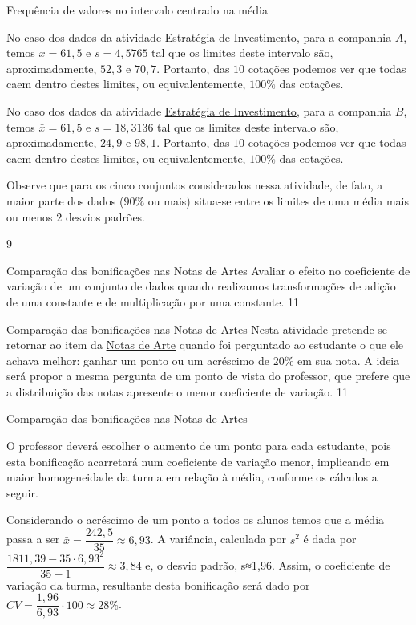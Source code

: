 {{{\begin{answer}{Frequência de valores no intervalo centrado na média}
{No caso dos dados da atividade \hyperref[\detokenize{PE104-3:ativ-estrategia-de-investimento}]{Estratégia de Investimento}, para a companhia $A$, temos $\bar{x}=61{,}5$ e $s=4{,}5765$ tal que os limites deste intervalo são, aproximadamente, $52{,}3$ e $70{,}7$. Portanto, das $10$ cotações podemos ver que todas caem dentro destes limites, ou equivalentemente, $100\%$ das cotações.

No caso dos dados da atividade \hyperref[\detokenize{PE104-3:ativ-estrategia-de-investimento}]{Estratégia de Investimento}, para a companhia $B$, temos $\bar{x}=61{,}5$ e $s=18{,}3136$ tal que os limites deste intervalo são, aproximadamente, $24{,}9$ e $98{,}1$. Portanto, das $10$ cotações podemos ver que todas caem dentro destes limites, ou equivalentemente, $100\%$ das cotações.

Observe que para os cinco conjuntos considerados nessa atividade, de fato, a maior parte dos dados ($90\%$ ou mais) situa-se entre os limites de uma média mais ou menos $2$ desvios padrões.
\columnbreak

\phantom{a}
}{9}
\end{answer}

\begin{objectives}{Comparação das bonificações nas Notas de Artes}
{
Avaliar o efeito no coeficiente de variação de um conjunto de dados quando realizamos transformações de adição de uma constante e de multiplicação por uma constante.
}{1}{1}
\end{objectives}
\marginpar{\vspace{-2em}}
\begin{sugestions}{Comparação das bonificações nas Notas de Artes}
{
Nesta atividade pretende-se retornar ao item  da \hyperref[\detokenize{PE104-0:ativ-notas-de-artes}]{Notas de Arte} quando foi perguntado ao estudante o que ele achava melhor: ganhar um ponto ou um acréscimo de $20\%$ em sua nota. A ideia será propor a mesma pergunta de um ponto de vista do professor, que prefere que a distribuição das notas apresente o menor coeficiente de variação.
}{1}{1}
\end{sugestions}
\begin{answer}{Comparação das bonificações nas Notas de Artes}
{
O professor deverá escolher o aumento de um ponto para cada estudante, pois esta bonificação acarretará num coeficiente de variação menor, implicando em maior homogeneidade da turma em relação à média, conforme os cálculos a seguir.

Considerando o acréscimo de um ponto a todos os alunos temos que a média passa a ser $\bar{x}=\dfrac{242{,}5}{35}\approx6{,}93$. A variância, calculada por $s^2$ é dada por $\dfrac{1811{,}39-35\cdot6{,}93^2}{35-1}\approx3{,}84$ e, o desvio padrão, s≈1,96. Assim, o coeficiente de variação da turma, resultante desta bonificação será dado por $CV=\dfrac{1{,}96}{6{,}93}\cdot100\approx28\%$.

}
\end{answer}}}}
